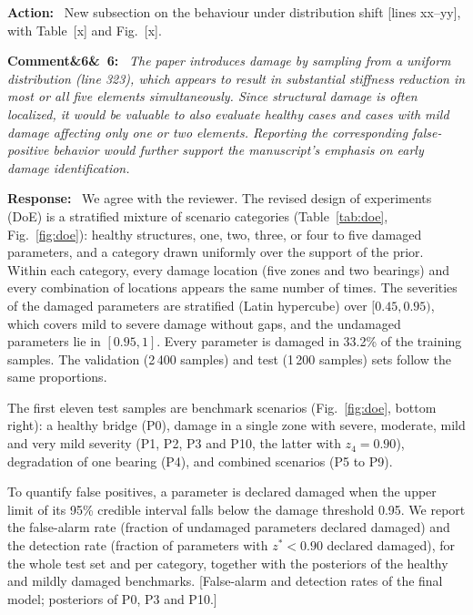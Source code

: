 \documentclass[11pt]{article}
\newenvironment{rcomment}[1]{\par\bigskip\noindent\textbf{Comment\ifx&#1&\else\ #1\fi:}\ \itshape}{\par}
\newenvironment{response}{\par\smallskip\noindent\color{resp}\textbf{Response:}\ }{\par}
\newenvironment{action}{\par\smallskip\noindent\color{resp}\textbf{Action:}\ }{\par}
\newcommand{\tbd}[1]{\textcolor{note}{\textsf{[#1]}}}
\newcommand{\lines}[1]{\tbd{lines #1}}
\begin{document}
\begin{action}
New subsection on the behaviour under distribution shift \lines{xx--yy}, with Table~\tbd{x} and Fig.~\tbd{x}.
\end{action}

\begin{rcomment}{6}
The paper introduces damage by sampling from a uniform distribution (line 323), which appears to result in substantial
stiffness reduction in most or all five elements simultaneously. Since structural damage is often localized, it would be
valuable to also evaluate healthy cases and cases with mild damage affecting only one or two elements. Reporting the
corresponding false-positive behavior would further support the manuscript's emphasis on early damage identification.
\end{rcomment}

\begin{response}
We agree with the reviewer. The revised design of experiments (DoE) is a stratified mixture of scenario categories
(Table~\ref{tab:doe}, Fig.~\ref{fig:doe}): healthy structures, one, two, three, or four to five damaged parameters, and a
category drawn uniformly over the support of the prior. Within each category, every damage location (five zones and two
bearings) and every combination of locations appears the same number of times. The severities of the damaged
parameters are stratified (Latin hypercube) over $[0.45,0.95)$, which covers mild to severe damage without gaps, and
the undamaged parameters lie in $[0.95,1]$. Every parameter is damaged in 33.2\% of the training samples. The validation
(2\,400 samples) and test (1\,200 samples) sets follow the same proportions.

The first eleven test samples are benchmark scenarios (Fig.~\ref{fig:doe}, bottom right): a healthy bridge (P0),
damage in a single zone with severe, moderate, mild and very mild severity (P1, P2, P3 and P10, the latter with
$z_4=0.90$), degradation of one bearing (P4), and combined scenarios (P5 to P9).

To quantify false positives, a parameter is declared damaged when the upper limit of its 95\% credible interval falls
below the damage threshold 0.95. We report the false-alarm rate (fraction of undamaged parameters declared damaged)
and the detection rate (fraction of parameters with $z^*<0.90$ declared damaged), for the whole test set and per
category, together with the posteriors of the healthy and mildly damaged benchmarks.
\tbd{False-alarm and detection rates of the final model; posteriors of P0, P3 and P10.}
\end{response}
\end{document}
